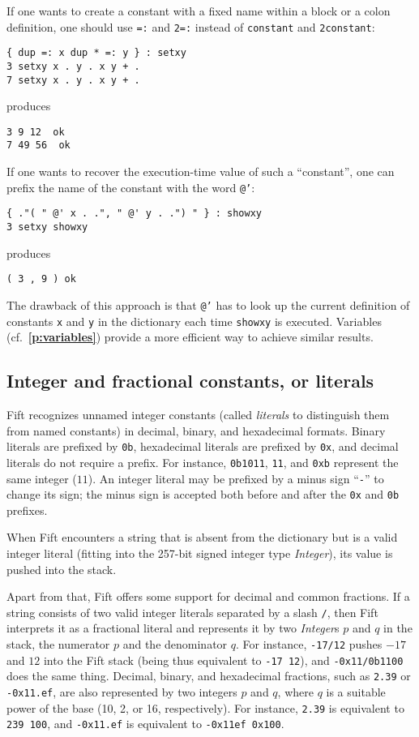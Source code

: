 \documentclass[12pt,oneside]{article}
\def\refpoint#1{{\rm\textbf{\ref{#1}}}}
\let\ptref=\refpoint
\def\mysubsection#1{\subsection{#1}\fancyhead[C]{\small{\textsc{\textrm{\thesubsection.} #1}}}}
\begin{document}
If one wants to create a constant with a fixed name within a block or a colon definition, one should use {\tt =:} and {\tt 2=:} instead of {\tt constant} and {\tt 2constant}:
\begin{verbatim}
{ dup =: x dup * =: y } : setxy
3 setxy x . y . x y + .
7 setxy x . y . x y + .
\end{verbatim}
produces
\begin{verbatim}
3 9 12  ok
7 49 56  ok
\end{verbatim}
If one wants to recover the execution-time value of such a ``constant'', one can prefix the name of the constant with the word {\tt @'}:
\begin{verbatim}
{ ."( " @' x . .", " @' y . .") " } : showxy
3 setxy showxy
\end{verbatim}
produces
\begin{verbatim}
( 3 , 9 ) ok
\end{verbatim}
The drawback of this approach is that {\tt @'} has to look up the current definition of constants {\tt x} and {\tt y} in the dictionary each time {\tt showxy} is executed. Variables (cf.~\ptref{p:variables}) provide a more efficient way to achieve similar results.

\mysubsection{Integer and fractional constants, or literals}\label{p:int.lit}
Fift recognizes unnamed integer constants (called {\em literals\/} to distinguish them from named constants) in decimal, binary, and hexadecimal formats. Binary literals are prefixed by {\tt 0b}, hexadecimal literals are prefixed by {\tt 0x}, and decimal literals do not require a prefix. For instance, {\tt 0b1011}, {\tt 11}, and {\tt 0xb} represent the same integer ($11$). An integer literal may be prefixed by a minus sign ``{\tt -}'' to change its sign; the minus sign is accepted both before and after the {\tt 0x} and {\tt 0b} prefixes.

When Fift encounters a string that is absent from the dictionary but is a valid integer literal (fitting into the 257-bit signed integer type {\em Integer}), its value is pushed into the stack.

Apart from that, Fift offers some support for decimal and common fractions. If a string consists of two valid integer literals separated by a slash {\tt /}, then Fift interprets it as a fractional literal and represents it by two {\em Integer\/}s $p$ and $q$ in the stack, the numerator $p$ and the denominator $q$. For instance, {\tt -17/12} pushes $-17$ and $12$ into the Fift stack (being thus equivalent to {\tt -17 12}), and {\tt -0x11/0b1100} does the same thing. Decimal, binary, and hexadecimal fractions, such as {\tt 2.39} or {\tt -0x11.ef}, are also represented by two integers $p$ and $q$, where $q$ is a suitable power of the base (10, 2, or 16, respectively). For instance, {\tt 2.39} is equivalent to {\tt 239 100}, and {\tt -0x11.ef} is equivalent to {\tt -0x11ef 0x100}.
\end{document}

